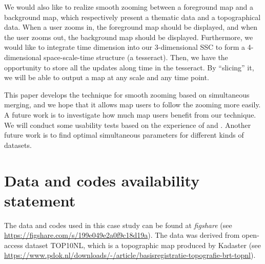\documentclass[twocolumn]{svjour3}          %
\begin{document}
We would also like to realize smooth zooming
between a foreground map and a background map,
which respectively present a thematic data and a topographical data.
When a user zooms in, the foreground map should be displayed,
and when the user zooms out,
the background map should be displayed.
Furthermore, we would like to 
integrate time dimension into our 3-dimensional SSC
to form a 4-dimensional space-scale-time structure (a tesseract).
Then, we have the opportunity to store all the updates along time in the tesseract.
By ``slicing'' it, we will be able to output a map at any scale and any time point.


This paper develops the technique for smooth zooming based on simultaneous merging,
and we hope that it allows map users to follow the zooming more easily.
A future work is to investigate 
how much map users benefit from our technique.
We will conduct some usability tests based on the experience of
\citet[]{Suba2017Thesis} and \citet{Midtbo2007}.
Another future work is to find optimal simultaneous parameters for 
different kinds of datasets.















\section*{Data and codes availability statement}

The data and codes used in this case study 
can be found at \emph{figshare} 
(see \url{https://figshare.com/s/199e049e2a0f9c18d19a}).
The data was derived from open-access dataset TOP10NL,
which is a topographic map produced by Kadaster
(see \url{https://www.pdok.nl/downloads/-/article/basisregistratie-topografie-brt-topnl}).
\end{document}
